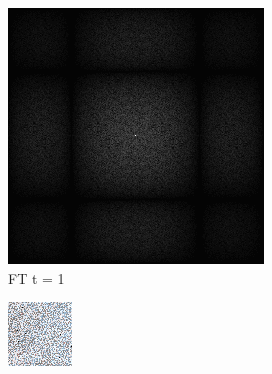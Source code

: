 \begin{figure}[H]
\begin{subfigure}[b]{0.2\linewidth}
        \includegraphics[width=\linewidth]{content/TemporalerAlg/Bilder/Retargeting/Bedeutung Retargeting/Sorting_Small_Block_WithRetargeting/Spektrum/Ausschnitt2.png}
         \caption{FT t = 1}
         \label{pic:retarget_t1}
    \end{subfigure}
    \begin{subfigure}[b]{0.2\linewidth}
        \includegraphics[width=\linewidth]{content/TemporalerAlg/Bilder/Retargeting/Bedeutung Retargeting/Sorting_Small_Block_WithRetargeting/Ausschnitt/Ausschnitt3.png}

\end{subfigure}
\end{figure}
